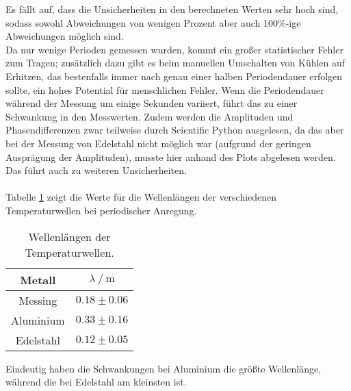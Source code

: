 \noindent Es fällt auf, dass die Unsicherheiten in den berechneten Werten sehr hoch sind, sodass sowohl Abweichungen von wenigen Prozent aber auch 100$\%$-ige Abweichungen möglich sind.\\
Da nur wenige Perioden gemessen wurden, kommt ein großer statistischer Fehler zum Tragen; zusätzlich dazu gibt es beim manuellen Umschalten von Kühlen auf Erhitzen, das bestenfalls immer nach
genau einer halben Periodendauer erfolgen sollte, ein hohes Potential für menschlichen Fehler. Wenn die Periodendauer während der Messung um einige Sekunden variiert, führt das zu einer Schwankung
in den Messwerten. Zudem werden die Amplituden und Phasendifferenzen zwar teilweise durch Scientific Python ausgelesen, da das aber bei der Messung von Edelstahl nicht möglich 
war (aufgrund der geringen Ausprägung der Amplituden), musste hier anhand des Plots abgelesen werden. Das führt auch zu weiteren Unsicherheiten. \\%
\\

Tabelle \ref{tab:die} zeigt die Werte für die Wellenlängen der verschiedenen Temperaturwellen bei periodischer Anregung.

\begin{table}
    \centering
    \caption{Wellenlängen der Temperaturwellen.}
    \label{tab:die}
    \begin{tabular}{c c}
        \toprule
        Metall & $\lambda \mathbin{/} \si{\m}$ \\
        \midrule
        Messing & $0.18 \pm 0.06$\\
        Aluminium & $0.33 \pm 0.16$\\
        Edelstahl & $0.12 \pm 0.05$\\
        \bottomrule
    \end{tabular}
\end{table}

Eindeutig haben die Schwankungen bei Aluminium die größte Wellenlänge, während die bei Edelstahl am kleinsten ist. 